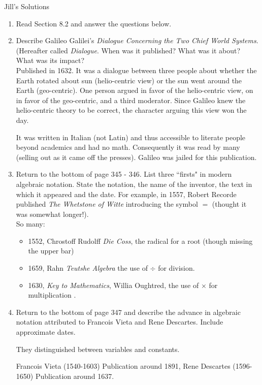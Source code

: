 \documentclass[12pt]{article}
\begin{document}
Jill's Solutions

\begin{enumerate}
\item Read Section 8.2 and answer the questions below.
\item Describe Galileo Galilei's \textit{Dialogue Concerning the Two Chief World Systems}. (Hereafter called \textit{Dialogue}. When was it published? What was it about? What was its impact?\\

Published in 1632. It was a dialogue between three people about whether the Earth rotated about sun (helio-centric view) or the sun went around the Earth (geo-centric). One person argued in favor of the helio-centric view, on in favor of the geo-centric, and a third moderator. Since Galileo knew the helio-centric theory to be correct, the character arguing this view won the day.

It was written in Italian (not Latin) and thus accessible to literate people beyond academics and had no math. Consequently it was read by many (selling out as it came off the presses). Galileo was jailed for this publication.
\vfill
\item Return to the bottom of page 345 - 346. List three ``firsts" in modern algebraic notation. State the notation, the name of the inventor, the text in which it appeared and the date. For example, in 1557, Robert Recorde published \textit{The Whetstone of Witte} introducing the symbol $=$ (thought it was somewhat longer!).\\

So many:\\
\begin{itemize}
\item 1552, Chrostoff Rudolff \textit{Die Coss}, the radical for a root (though missing the upper bar)
\item 1659, Rahn \textit{Teutshe Algebra} the use of $\div$ for division.
\item1630, \textit{Key to Mathematics}, Willia Oughtred, the use of $\times$ for multiplication .
\end{itemize}
\vfill
\item Return to the bottom of page 347 and describe the advance in algebraic notation attributed to Francois Vieta and Rene Descartes. Include approximate dates.

They distinguished between variables and constants.

Francois Vieta (1540-1603) Publication around 1891, Rene Descartes (1596-1650) Publication around 1637.


\end{enumerate}
\end{document}
